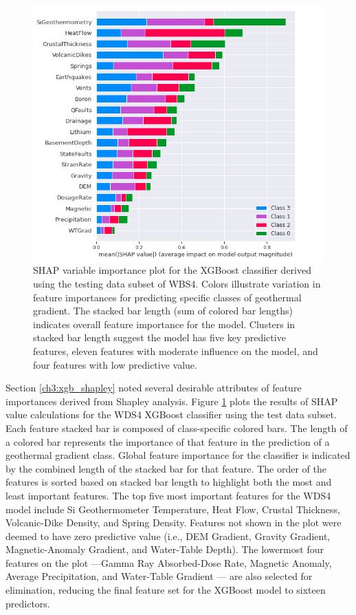 \begin{figure}
\centering
\includegraphics[width=\textwidth]{templates/images/Figure-Shapley_notitle.png}
\caption[XGBoost SHAP variable importance]{SHAP variable importance plot for the XGBoost classifier derived using the testing data subset of WBS4. Colors illustrate variation in feature importances for predicting specific classes of geothermal gradient. The stacked bar length (sum of colored bar lengths) indicates overall feature importance for the model. Clusters in stacked bar length suggest the model has five key predictive features, eleven features with moderate influence on the model, and four features with low predictive value.}
\label{fig:xgb_shap_global}
\end{figure}

Section \ref{ch3:xgb_shapley} noted several desirable attributes of feature importances derived from Shapley analysis. Figure \ref{fig:xgb_shap_global} plots the results of SHAP value calculations for the WDS4 XGBoost classifier using the test data subset. Each feature stacked bar is composed of class-specific colored bars. The length of a colored bar represents the importance of that feature in the prediction of a geothermal gradient class. Global feature importance for the classifier is indicated by the combined length of the stacked bar for that feature. The order of the features is sorted based on stacked bar length to highlight both the most and least important features. The top five most important features for the WDS4 model include Si Geothermometer Temperature, Heat Flow, Crustal Thickness, Volcanic-Dike Density, and Spring Density. Features not shown in the plot were deemed to have zero predictive value (i.e., DEM Gradient, Gravity Gradient, Magnetic-Anomaly Gradient, and Water-Table Depth). The lowermost four features on the plot ---Gamma Ray Absorbed-Dose Rate, Magnetic Anomaly, Average Precipitation, and Water-Table Gradient --- are also selected for elimination, reducing the final feature set for the XGBoost model to sixteen predictors.

